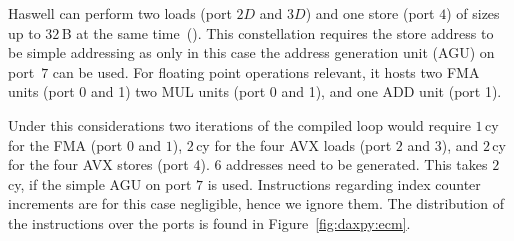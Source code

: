 Haswell can perform two loads (port $2D$ and $3D$) and one store (port $4$) of
sizes up to $32$\,B at the same time~(\cite{agner-2016-11-3}).
This constellation requires the store address to be simple addressing as only in
this case the address generation unit (AGU) on port~$7$ can be used.
%
For floating point operations relevant, it hosts two FMA units (port 0 and
1) two MUL units (port 0 and 1), and one ADD unit (port 1).

Under this considerations two iterations of the compiled loop would require $1$\,cy
for the FMA (port $0$ and $1$), $2$\,cy for the four AVX loads (port $2$ and $3$),
and $2$\,cy for the four AVX stores (port $4$).
$6$ addresses need to be generated.
This takes $2$\,cy, if the simple AGU on port $7$ is used.
Instructions regarding index counter increments are for this case negligible, hence we ignore them.
The distribution of the instructions over the ports is found in Figure~\ref{fig:daxpy:ecm}.

